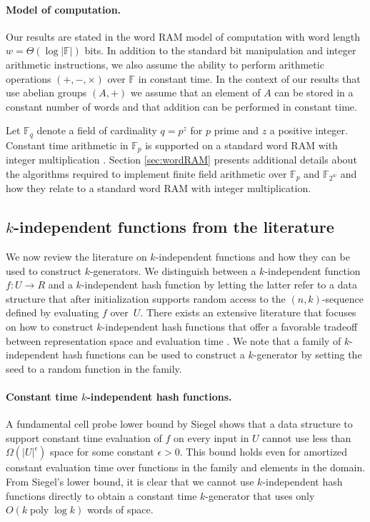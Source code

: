 \documentclass[a4paper,11pt]{article}
\theoremstyle{plain}
\theoremstyle{definition}
\newcommand{\F}{\mathbb{F}}
\DeclareMathOperator{\poly}{poly}
\begin{document}
\paragraph{Model of computation.}
Our results are stated in the word RAM model of computation with word length ${w = \Theta(\log|\F|)}$ bits. 
In addition to the standard bit manipulation and integer arithmetic instructions, we also assume the ability to perform arithmetic operations $(+, -, \times)$ over $\F$ in constant time. 
In the context of our results that use abelian groups $(A, +)$ we assume that an element of $A$ can be stored in a constant number of words and that addition can be performed in constant time. 

Let $\F_{q}$ denote a field of cardinality $q = p^{z}$ for $p$ prime and $z$ a positive integer.
Constant time arithmetic in $\F_{p}$ is supported on a standard word RAM with integer multiplication \cite{granlund1994}. 
Section \ref{sec:wordRAM} presents additional details about the algorithms required to implement finite field arithmetic over $\F_p$ and $\F_{2^{w}}$ and how they relate to a standard word RAM with integer multiplication.
\subsection{$k$-independent functions from the literature} \label{sec:hashing}
We now review the literature on $k$-independent functions and how they can be used to construct $k$-generators.
We distinguish between a $k$-independent function $f : U \to R$ and a $k$-independent hash function by letting the latter refer to a data structure 
that after initialization supports random access to the $(n,k)$-sequence defined by evaluating $f$ over~$U$.  
There exists an extensive literature that focuses on how to construct $k$-independent hash functions that offer a favorable tradeoff between representation space and evaluation time \cite{dietzfelbinger2012}. 
We note that a family of $k$-independent hash functions can be used to construct a $k$-generator by setting the seed to a random function in the family.

\paragraph{Constant time $k$-independent hash functions.}
A fundamental cell probe lower bound by Siegel \cite{siegel2004} shows that a data structure to support constant time evaluation of $f$ on every input in $U$ 
cannot use less than $\Omega(|U|^{\epsilon})$ space for some constant $\epsilon > 0$. 
This bound holds even for amortized constant evaluation time over functions in the family and elements in the domain.
From Siegel's lower bound, it is clear that we cannot use $k$-independent hash functions directly to obtain a constant time $k$-generator that uses only $O(k \poly \log k)$ words of space.
\end{document}
